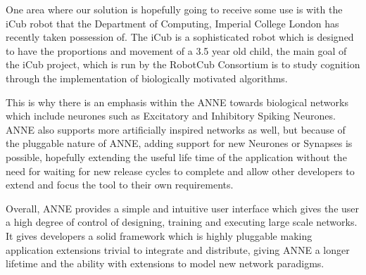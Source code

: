\documentclass[12pt,twoside]{article}
\begin{document}
{One area where our solution is hopefully going to
receive some use is with the iCub robot that the Department of
Computing, Imperial College London has recently taken possession of.
The iCub is a sophisticated robot which is designed to have the
proportions and movement of a 3.5 year old child, the main goal of the
iCub project, which is run by the RobotCub Consortium
is to study cognition through the implementation of biologically
motivated algorithms.

This is why there is an emphasis within the ANNE towards biological
networks which include neurones such as Excitatory and Inhibitory
Spiking Neurones. ANNE also supports more artificially inspired
networks as well, but because of the pluggable nature of ANNE, adding
support for new Neurones or Synapses is possible, hopefully extending
the useful life time of the application without the need for waiting
for new release cycles to complete and allow other developers to extend
and focus the tool to their own requirements.

Overall, ANNE provides a simple and intuitive user interface which gives
the user a high degree of control of designing, training and executing
large scale networks. It gives developers a solid framework which is
highly pluggable making application extensions trivial to integrate and
distribute, giving ANNE a longer lifetime and the ability with
extensions to model new network paradigms.
}
\end{document}
